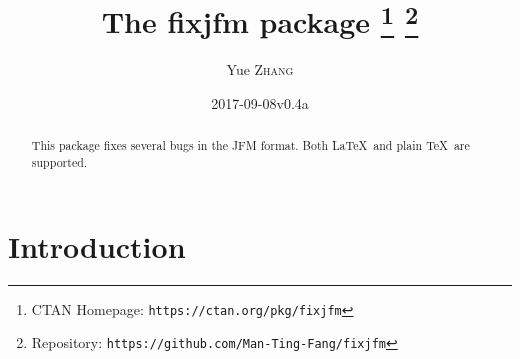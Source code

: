 \documentclass[a4paper]{article}
\newcommand\NormalSans{\normalfont\sffamily}
\newcommand\pkg[1]{{\protect\NormalSans#1}}
\begin{document}
\title{The \pkg{fixjfm} package%
  \thanks{CTAN Homepage: \texttt{https://ctan.org/pkg/fixjfm}}
  \thanks{Repository: \texttt{https://github.com/Man-Ting-Fang/fixjfm}}}
\author{Yue \textsc{Zhang}}
\date{2017-09-08\quad v0.4a}

\maketitle

\begin{abstract}
This package fixes several bugs in the JFM format. Both \LaTeX\ and plain \TeX\
are supported.
\end{abstract}

\section{Introduction}
\end{document}
